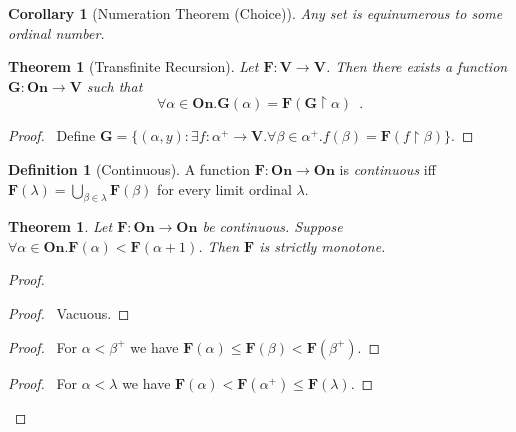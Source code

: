 \documentclass{article}
\let\qed\relax
\newtheorem{theorem}[axiom]{Theorem}
\newtheorem{corollary}{Corollary}[axiom]
\theoremstyle{definition}
\newtheorem{definition}[axiom]{Definition}
\begin{document}
    \begin{corollary}[Numeration Theorem (Choice)]
        Any set is equinumerous to some ordinal number.
    \end{corollary}

    \begin{theorem}[Transfinite Recursion]
        Let $\mathbf{F} : \mathbf{V} \rightarrow \mathbf{V}$. Then there exists a function $\mathbf{G}
        : \mathbf{On} \rightarrow \mathbf{V}$ such that
        \[ \forall \alpha \in \mathbf{On}. \mathbf{G}(\alpha) = \mathbf{F}(\mathbf{G} \restriction \alpha)
        \enspace . \]
    \end{theorem}

    \begin{proof}
        \pf\ Define $\mathbf{G} = \{ (\alpha, y) : \exists f : \alpha^+ \rightarrow \mathbf{V}.
        \forall \beta \in \alpha^+. f(\beta) = \mathbf{F}(f \restriction \beta) \}$. \qed
    \end{proof}

    \begin{definition}[Continuous]
        A function $\mathbf{F} : \mathbf{On} \rightarrow \mathbf{On}$ is \emph{continuous} iff
        $\mathbf{F}(\lambda) = \bigcup_{\beta \in \lambda} \mathbf{F}(\beta)$ for every limit ordinal
        $\lambda$.
    \end{definition}

    \begin{theorem}
        Let $\mathbf{F} : \mathbf{On} \rightarrow \mathbf{On}$ be continuous. Suppose
        $\forall \alpha \in \mathbf{On}. \mathbf{F}(\alpha) < \mathbf{F}(\alpha + 1)$.
        Then $\mathbf{F}$ is strictly monotone.
    \end{theorem}

    \begin{proof}
        \pf
        \begin{proof}
            \pf\ Vacuous.
        \end{proof}
        \begin{proof}
            \pf\ For $\alpha < \beta^+$ we have $\mathbf{F}(\alpha) \leq \mathbf{F}(\beta) < \mathbf{F}(\beta^+)$.
        \end{proof}
        \begin{proof}
            \pf\ For $\alpha < \lambda$ we have $\mathbf{F}(\alpha) < \mathbf{F}(\alpha^+) \leq \mathbf{F}(\lambda)$.
        \end{proof}
        \qed
    \end{proof}
\end{document}
